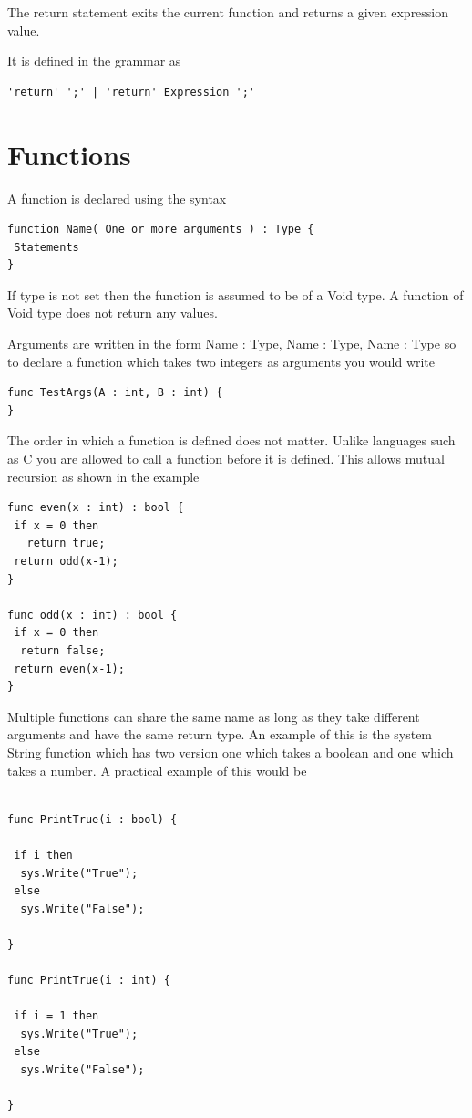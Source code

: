 \documentclass[]{final_report}
\begin{document}
The return statement exits the current function and returns a given expression value. 

It is defined in the grammar as
\begin{verbatim}
'return' ';' | 'return' Expression ';'
\end{verbatim}

\section{Functions}

A function is declared using the syntax

\begin{verbatim}
function Name( One or more arguments ) : Type {
 Statements
}
\end{verbatim}

If type is not set then the function is assumed to be of a Void type. A function of Void type does not return any values.

Arguments are written in the form Name : Type, Name : Type, Name : Type so to declare a function which takes two integers as arguments you would write

\begin{verbatim}
func TestArgs(A : int, B : int) {
}
\end{verbatim}
The order in which a function is defined does not matter. Unlike languages such as C you are allowed to call a function before it is defined. This allows mutual recursion as shown in the example

\begin{verbatim}
func even(x : int) : bool {
 if x = 0 then 
   return true;
 return odd(x-1);
}

func odd(x : int) : bool {
 if x = 0 then 
  return false;
 return even(x-1);
}
\end{verbatim}

Multiple functions can share the same name as long as they take different arguments and have the same return type. An example of this is the system String function which has two version one which takes a boolean and one which takes a number. A practical example of this would be

\begin{verbatim}

func PrintTrue(i : bool) {

 if i then 
  sys.Write("True"); 
 else 
  sys.Write("False");

}

func PrintTrue(i : int) {

 if i = 1 then
  sys.Write("True");
 else
  sys.Write("False");

}

\end{verbatim}
\end{document}
